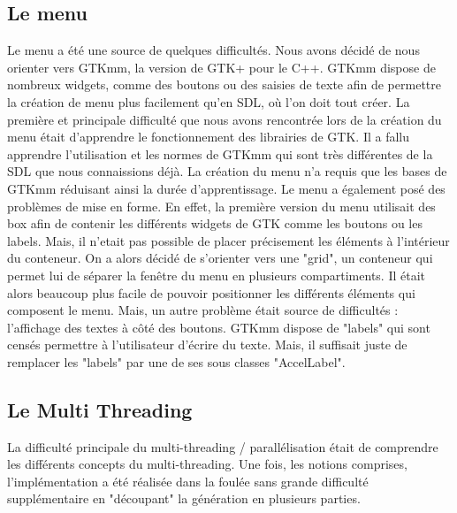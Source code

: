 \documentclass{article}
\begin{document}
\subsection*{Le menu}
Le menu a été une source de quelques difficultés.
Nous avons décidé de nous orienter vers GTKmm, la version de GTK+ pour le C++.
GTKmm dispose de nombreux widgets, comme des boutons ou des saisies de texte afin de permettre la création de menu plus facilement qu'en SDL, où l'on doit tout créer.
La première et principale difficulté que nous avons rencontrée lors de la création du menu était d'apprendre le fonctionnement des librairies de GTK. Il a fallu apprendre l'utilisation et les normes de GTKmm qui sont très différentes de la SDL que nous connaissions déjà.
La création du menu n'a requis que les bases de GTKmm réduisant ainsi la durée d'apprentissage.
Le menu a également posé des problèmes de mise en forme.
En effet, la première version du menu utilisait des box afin de contenir les différents widgets de GTK comme les boutons ou les labels.
Mais, il n'etait pas possible de placer précisement les éléments à l'intérieur du conteneur.
On a alors décidé de s'orienter vers une "grid", un conteneur qui permet lui de séparer la fenêtre du menu en plusieurs compartiments.
Il était alors beaucoup plus facile de pouvoir positionner les différents éléments qui composent le menu.
Mais, un autre problème était source de difficultés : l'affichage des textes à côté des boutons.
GTKmm dispose de "labels" qui sont censés permettre à l'utilisateur d'écrire du texte.
Mais, il suffisait juste de remplacer les "labels" par une de ses sous classes "AccelLabel".

\subsection*{Le Multi Threading}
La difficulté principale du multi-threading / parallélisation était de comprendre les différents concepts du multi-threading.
Une fois, les notions comprises, l'implémentation a été réalisée dans la foulée sans grande difficulté supplémentaire en "découpant" la génération en plusieurs parties.
\end{document}
